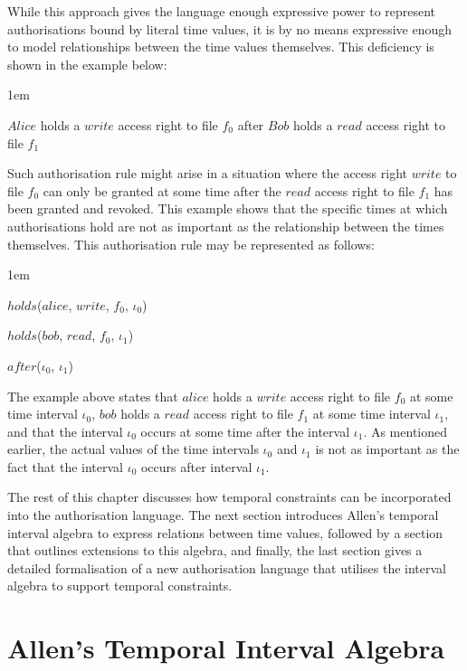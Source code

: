 \documentclass[11pt]{report}
\newenvironment{vquote}
{
  \begin{list}{}{\leftmargin 1em}\item[]
}
{
  \end{list}
}
\begin{document}
      While this approach gives the language enough expressive power to
      represent authorisations bound by literal time values, it is by no means
      expressive enough to model relationships between the time values
      themselves. This deficiency is shown in the example below:

      \begin{vquote}
        $Alice$ holds a $write$ access right to file $f_0$ after $Bob$ holds a
        $read$ access right to file $f_1$
      \end{vquote}

      Such authorisation rule might arise in a situation where the access right
      $write$ to file $f_0$ can only be granted at some time after the $read$
      access right to file $f_1$ has been granted and revoked. This example
      shows that the specific times at which authorisations hold are not as
      important as the relationship between the times themselves. This
      authorisation rule may be represented as follows:

      \begin{vquote}
        $holds$($alice$, $write$, $f_0$, $\iota_0$)

        $holds$($bob$, $read$, $f_0$, $\iota_1$)

        $after$($\iota_0$, $\iota_1$)
      \end{vquote}

      The example above states that $alice$ holds a $write$ access right to
      file $f_0$ at some time interval $\iota_0$, $bob$ holds a $read$ access
      right to file $f_1$ at some time interval $\iota_1$, and that the
      interval $\iota_0$ occurs at some time after the interval $\iota_1$. As
      mentioned earlier, the actual values of the time intervals $\iota_0$ and
      $\iota_1$ is not as important as the fact that the interval $\iota_0$
      occurs after interval $\iota_1$.

      The rest of this chapter discusses how temporal constraints can be
      incorporated into the authorisation language. The next section introduces
      Allen's temporal interval algebra to express relations between time
      values, followed by a section that outlines extensions to this algebra,
      and finally, the last section gives a detailed formalisation of a new
      authorisation language that utilises the interval algebra to support
      temporal constraints.

    \section{Allen's Temporal Interval Algebra}
      \label{sect-tempo-algeb}
\end{document}
